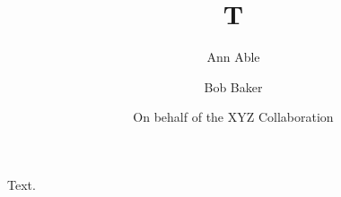 \documentclass{elsarticle}
\newcommand\obo{On behalf of}
\begin{document}
\begin{frontmatter}
\title{T}
\author{Ann Able}
\author{Bob Baker}
\address{Univ X}
\author{\obo{} the XYZ Collaboration}
\end{frontmatter}
Text.
\end{document}
